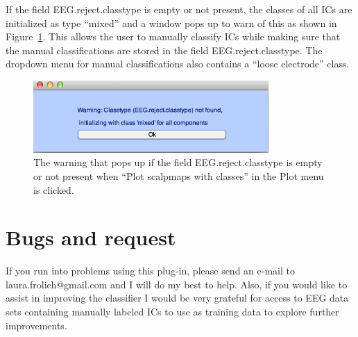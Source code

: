 \documentclass[10pt, twoside, a4paper]{article}
\begin{document}
If the field EEG.reject.classtype is empty or not present, the classes
of all ICs are initialized as type ``mixed'' and a window pops up to
warn of this as shown in Figure~\ref{fig:noclasseswarning}. This
allows the user to manually classify ICs while making sure that the
manual classifications are stored in the field
EEG.reject.classtype. The dropdown menu for manual classifications
also contains a ``loose electrode'' class.

\begin{figure}
\center
\includegraphics[width=0.8\textwidth]{figs/noclasseswarning}
\caption{The warning that pops up if the field EEG.reject.classtype is
  empty or not present when ``Plot scalpmaps with classes'' in the
  Plot menu is clicked.}
\label{fig:noclasseswarning}
\end{figure}

\section{Bugs and request}
If you run into problems using this plug-in, please send an e-mail to
laura.frolich@gmail.com and I will do my best to help. Also, if you
would like to assist in improving the classifier I would be very
grateful for access to EEG data sets containing manually labeled ICs
to use as training data to explore further improvements.

\clearpage

{}

\end{document}
